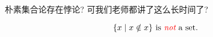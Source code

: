 \begin{frame}{}
  \begin{center}
     朴素集合论存在悖论? 可我们老师都讲了这么长时间了?
    \vspace{0.60cm}
  \end{center}
\end{frame}

\begin{frame}{}
  \begin{center}

    \pause
    \vspace{0.20cm}
    \begin{theorem}
      \[
        \{x \mid x \notin x\} \text{ is \textcolor{red}{\it not} a set.}
      \]
    \end{theorem}
  \end{center}
\end{frame}
